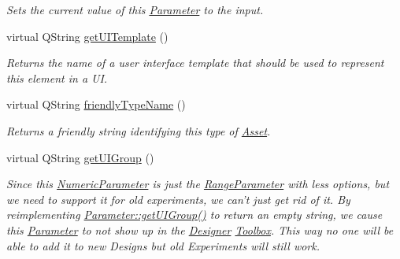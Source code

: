 \begin{DoxyCompactItemize}
\begin{DoxyCompactList}\small\item\em Sets the current value of this \hyperlink{class_picto_1_1_parameter}{Parameter} to the input. \end{DoxyCompactList}\item 
\hypertarget{class_picto_1_1_numeric_parameter_aaf59771a428af9de553ed9a025ea8045}{virtual Q\-String \hyperlink{class_picto_1_1_numeric_parameter_aaf59771a428af9de553ed9a025ea8045}{get\-U\-I\-Template} ()}\label{class_picto_1_1_numeric_parameter_aaf59771a428af9de553ed9a025ea8045}

\begin{DoxyCompactList}\small\item\em Returns the name of a user interface template that should be used to represent this element in a U\-I. \end{DoxyCompactList}\item 
virtual Q\-String \hyperlink{class_picto_1_1_numeric_parameter_aef9dcc6a73d7ce206b3e94c8ba906a4c}{friendly\-Type\-Name} ()
\begin{DoxyCompactList}\small\item\em Returns a friendly string identifying this type of \hyperlink{class_picto_1_1_asset}{Asset}. \end{DoxyCompactList}\item 
\hypertarget{class_picto_1_1_numeric_parameter_a517c3a6f97387e7932174e7c8e05e842}{virtual Q\-String \hyperlink{class_picto_1_1_numeric_parameter_a517c3a6f97387e7932174e7c8e05e842}{get\-U\-I\-Group} ()}\label{class_picto_1_1_numeric_parameter_a517c3a6f97387e7932174e7c8e05e842}

\begin{DoxyCompactList}\small\item\em Since this \hyperlink{class_picto_1_1_numeric_parameter}{Numeric\-Parameter} is just the \hyperlink{class_picto_1_1_range_parameter}{Range\-Parameter} with less options, but we need to support it for old experiments, we can't just get rid of it. By reimplementing \hyperlink{class_picto_1_1_parameter_abc3fd80bab8d8086fedf29eb50e733f3}{Parameter\-::get\-U\-I\-Group()} to return an empty string, we cause this \hyperlink{class_picto_1_1_parameter}{Parameter} to not show up in the \hyperlink{class_designer}{Designer} \hyperlink{class_toolbox}{Toolbox}. This way no one will be able to add it to new Designs but old Experiments will still work. \end{DoxyCompactList}\end{DoxyCompactItemize}
